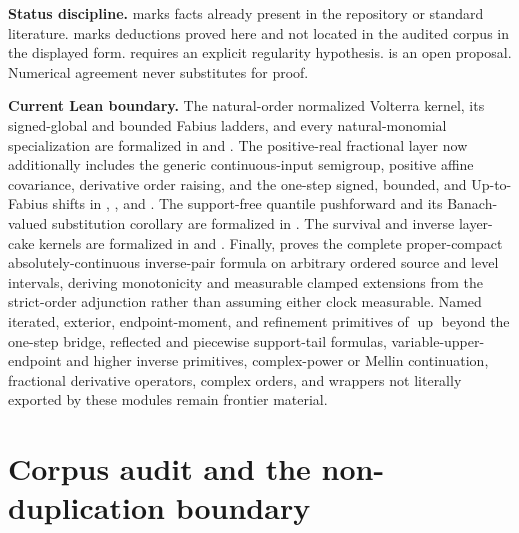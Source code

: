 \documentclass[11pt,oneside]{article}
\theoremstyle{definition}
\theoremstyle{remark}
\newcommand{\Up}{\operatorname{up}}
\newcommand{\1}{\mathbf 1}
\begin{document}
\begin{statusbox}
\textbf{Status discipline.}
\statusbackground{} marks facts already present in the repository or standard
literature.  \statusprovedPartll{} marks deductions proved here and not located in the
audited corpus in the displayed form.  \statusconditional{} requires an explicit
regularity hypothesis.  \statusconjecture{} is an open proposal.  Numerical
agreement never substitutes for proof.
\end{statusbox}

\begin{statusbox}
\textbf{Current Lean boundary.}
The natural-order normalized Volterra kernel, its signed-global and bounded
Fabius ladders, and every natural-monomial specialization are formalized in
 and .
The positive-real fractional layer now additionally includes the generic continuous-input
semigroup, positive affine covariance, derivative order raising, and the one-step signed,
bounded, and Up-to-Fabius shifts in ,
, and .
The support-free quantile pushforward and its Banach-valued substitution
corollary are formalized in .  The survival and inverse
layer-cake kernels are formalized in  and
.  Finally,  proves the
complete proper-compact absolutely-continuous inverse-pair formula on arbitrary ordered
source and level intervals, deriving monotonicity and measurable clamped extensions from
the strict-order adjunction rather than assuming either clock measurable.  Named
iterated, exterior, endpoint-moment, and refinement primitives of \(\Up\) beyond the
one-step bridge, reflected and piecewise support-tail formulas, variable-upper-endpoint and
higher inverse primitives, complex-power or Mellin continuation, fractional derivative
operators, complex orders, and wrappers not literally exported by these modules remain
frontier material.
\end{statusbox}


\clearpage

\section{Corpus audit and the non-duplication boundary}
\label{p8:sec:audit}
\end{document}
